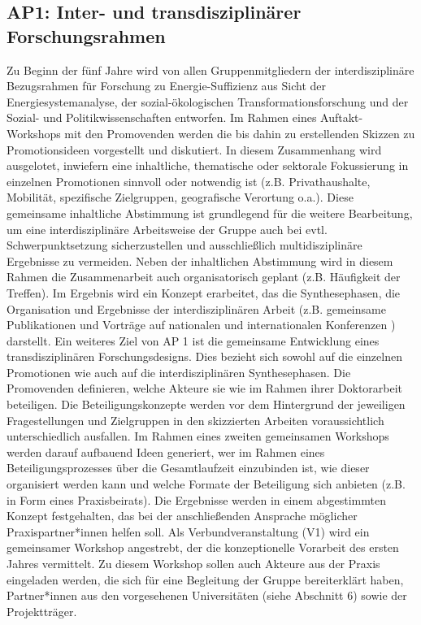 \documentclass[a4paper,11pt,twoside]{scrartcl}
\begin{document}
\subsection*{AP1: Inter- und transdisziplinärer Forschungsrahmen}

Zu Beginn der fünf Jahre wird von allen Gruppenmitgliedern der interdisziplinäre Bezugsrahmen für Forschung zu Energie-Suffizienz aus Sicht der Energiesystemanalyse, der sozial-ökologischen Transformationsforschung und der Sozial- und Politikwissenschaften entworfen. Im Rahmen eines Auftakt-Workshops mit den Promovenden werden die bis dahin zu erstellenden Skizzen zu Promotionsideen vorgestellt und diskutiert. In diesem Zusammenhang wird ausgelotet, inwiefern eine inhaltliche, thematische oder sektorale Fokussierung in einzelnen Promotionen sinnvoll oder notwendig ist (z.B. Privathaushalte, Mobilität, spezifische Zielgruppen, geografische Verortung o.a.). Diese gemeinsame inhaltliche Abstimmung ist grundlegend für die weitere Bearbeitung, um eine interdisziplinäre Arbeitsweise der Gruppe auch bei evtl. Schwerpunktsetzung sicherzustellen und ausschließlich multidisziplinäre Ergebnisse zu vermeiden. Neben der inhaltlichen Abstimmung wird in diesem Rahmen die Zusammenarbeit auch organisatorisch geplant (z.B. Häufigkeit der Treffen). Im Ergebnis wird ein Konzept erarbeitet, das die Synthesephasen, die Organisation und Ergebnisse der interdisziplinären Arbeit (z.B. gemeinsame Publikationen und Vorträge auf nationalen und internationalen Konferenzen ) darstellt.  
Ein weiteres Ziel von AP 1 ist die gemeinsame Entwicklung eines transdisziplinären Forschungsdesigns. Dies bezieht sich sowohl auf die einzelnen Promotionen wie auch auf die interdisziplinären Synthesephasen. Die Promovenden definieren, welche Akteure sie wie im Rahmen ihrer Doktorarbeit beteiligen. Die Beteiligungskonzepte werden vor dem Hintergrund der jeweiligen Fragestellungen und Zielgruppen in den skizzierten Arbeiten voraussichtlich unterschiedlich ausfallen. Im Rahmen eines zweiten gemeinsamen Workshops werden darauf aufbauend Ideen generiert, wer im Rahmen eines Beteiligungsprozesses über die Gesamtlaufzeit einzubinden ist, wie dieser organisiert werden kann und welche Formate der Beteiligung sich anbieten (z.B. in Form eines Praxisbeirats). Die Ergebnisse werden in einem abgestimmten Konzept festgehalten, das bei der anschließenden Ansprache möglicher Praxispartner*innen helfen soll. 
Als Verbundveranstaltung (V1) wird ein gemeinsamer Workshop angestrebt, der die konzeptionelle Vorarbeit des ersten Jahres vermittelt. Zu diesem Workshop sollen auch Akteure aus der Praxis eingeladen werden, die sich für eine Begleitung der Gruppe bereiterklärt haben, Partner*innen aus den vorgesehenen Universitäten (siehe Abschnitt 6) sowie der Projektträger.
\end{document}
